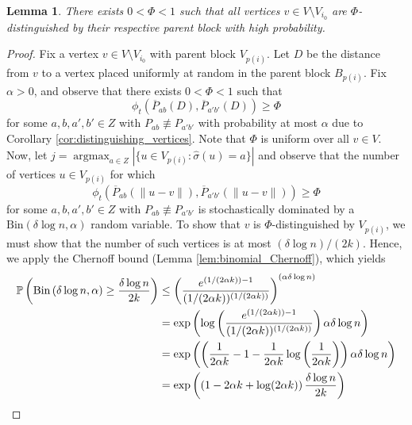 \documentclass{article}
\DeclareMathOperator*{\argmax}{argmax}
\renewcommand{\P}{\mathbb{P}}
\newcommand{\1}{\mathbbm{1}}
\theoremstyle{definition}
\theoremstyle{plain}
\newtheorem{lemma}{Lemma}
\begin{document}
\begin{lemma}
\label{lem:propagate_distinguishing_vertices}
    There exists $0 < \Phi < 1$ such that all vertices $v \in V \setminus V_{i_0}$ are $\Phi$-distinguished by their respective parent block with high probability.
\end{lemma}
\begin{proof}
    Fix a vertex $v \in V \setminus V_{i_0}$ with parent block $V_{p(i)}$. Let $D$ be the distance from $v$ to a vertex placed uniformly at random in the parent block $B_{p(i)}$. Fix $\alpha > 0$, and observe that there exists $0 < \Phi < 1$ such that 
    \begin{equation*}
        \phi_t(\overline{P}_{ab}(D), \overline{P}_{a'b'}(D)) \geq \Phi
    \end{equation*}
    for some $a,b,a',b' \in Z$ with $P_{ab} \not \equiv P_{a'b'}$ with probability at most $\alpha$ due to Corollary \ref{cor:distinguishing_vertices}. Note that $\Phi$ is uniform over all $v \in V$. Now, let $j = \argmax_{a \in Z} |\{ u \in V_{p(i)}: \hat{\sigma}(u) = a \}|$ and observe that the number of vertices $u \in V_{p(i)}$ for which 
    \begin{equation*}
        \phi_t(\overline{P}_{ab}(\|u-v\|), \overline{P}_{a'b'}(\|u-v\|)) \geq \Phi
    \end{equation*}
    for some $a,b,a',b' \in Z$ with $P_{ab} \not \equiv P_{a'b'}$ is stochastically dominated by a $\text{Bin}(\delta\log n, \alpha)$ random variable. To show that $v$ is $\Phi$-distinguished by $V_{p(i)}$, we must show that the number of such vertices is at most $(\delta \log n) / (2k)$. Hence, we apply the Chernoff bound (Lemma \ref{lem:binomial_Chernoff}), which yields
    \begin{align}
    \label{eq:lack_distinguishing_vertices_prob}
        \P\left(\text{Bin}\left(\delta \log n, \alpha \right) \geq \frac{\delta \log n}{2k} \right) 
        \notag &\leq \left( \frac{e^{(1/(2\alpha k)) - 1}}{(1/(2\alpha k))^{(1/(2\alpha k))}}\right)^{(\alpha \delta \log n)} \notag \\
        &= \exp\left(\log\left(\frac{e^{(1/(2\alpha k)) - 1}}{(1/(2\alpha k))^{(1/(2\alpha k))}}\right) \alpha \delta \log n \right) \notag \\
        &= \exp\left(\left(\frac{1}{2\alpha k} - 1 - \frac{1}{2\alpha k}\log\left(\frac{1}{2\alpha k}\right)\right) \alpha \delta \log n \right) \notag \\
        &= \exp\left(\left(1 - 2\alpha k + \log(2\alpha k)\right) \frac{\delta \log n}{2k} \right) \notag \\

\end{align}
\end{proof}
\end{document}
